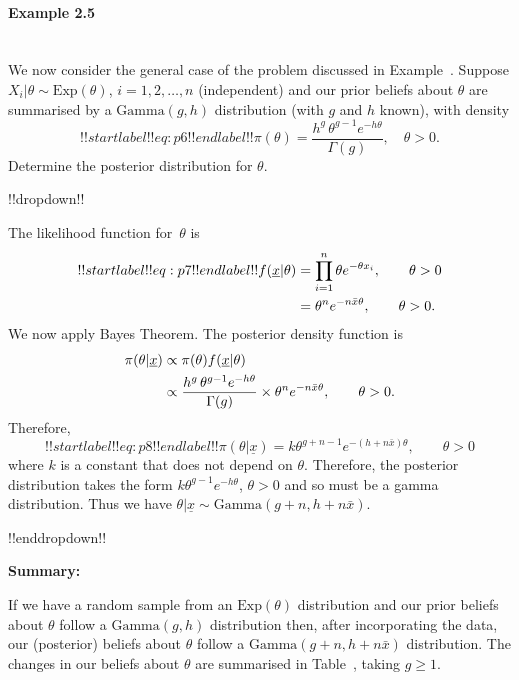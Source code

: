 \paragraph{Example 2.5}{~\\
  We now consider the general case of the problem discussed in Example~.  Suppose $X_i|\theta\sim \mathrm{Exp}(\theta)$, $i=1,2,\ldots,n$ (independent) and our prior beliefs about $\theta$ are summarised by a $\mathrm{Gamma}(g,h)$ distribution (with $g$ and $h$ known), with density
\begin{equation}
!!startlabel!! eq:p6 !!endlabel!!
\pi(\theta)=\frac{h^g\,\theta^{g-1}e^{-h\theta}}{\Gamma(g)}, 
\quad\theta>0.
\end{equation}
Determine the posterior distribution for $\theta$.

!!dropdown!!

The likelihood function for~$\theta$ is
    \begin{align}
    !!startlabel!! eq:p7 !!endlabel!!
   f(\underline{x}|\theta)&=\prod_{i=1}^n \theta e^{-\theta x_i}, 
    \quad\quad\theta>0 \notag \\
    &= \theta^n e^{-n\bar x\theta}, \quad\quad\theta>0. 
    \end{align}
    We now apply Bayes Theorem. The posterior density function is
    \begin{align}
    \pi(\theta|\underline{x})&\propto\pi(\theta)f(\underline{x}|\theta) \notag \\
    &\propto\frac{h^g\,\theta^{g-1}e^{-h\theta}}{\Gamma(g)}\times
    \theta^n e^{-n\bar x\theta},\quad\quad\theta>0. \notag
    \end{align}
    Therefore,
    \begin{equation}
        !!startlabel!! eq:p8 !!endlabel!! \pi(\theta|\underline{x}) = k\theta^{g+n-1}e^{-(h+n\bar x)\theta},\quad\quad\theta>0
    \end{equation}
    where $k$ is a constant that does not depend on $\theta$. Therefore, the posterior distribution takes the form $k\theta^{g-1}e^{-h\theta}$, $\theta>0$ and so must be a gamma distribution. Thus we have $\theta|\underline{x}\sim \mathrm{Gamma}(g+n,h+n\bar x)$.

!!enddropdown!!



\textbf{Summary:} 

If we have a random sample from an $\mathrm{Exp}(\theta)$ distribution and our prior beliefs about $\theta$ follow a $\mathrm{Gamma}(g,h)$ distribution then, after incorporating the data, our (posterior) beliefs about $\theta$ follow a $\mathrm{Gamma}(g+n,h+n\bar x)$ distribution.
The changes in our beliefs about $\theta$ are summarised in Table~, taking $g\geq 1$.


}
